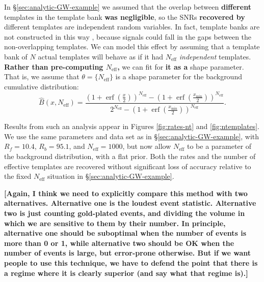 \documentclass[aps,prd]{revtex4-1}
\newcommand{\xmin}{x_\mathrm{min}}
\newcommand{\ilya}[1]{{\color{red} \bf #1}}
\DeclareMathOperator{\erf}{erf}
\begin{document}
In \S \ref{sec:analytic-GW-example} we assumed that the overlap
between \ilya{different} templates in the template bank \ilya{was
  negligible}, so the SNRs \ilya{recovered by} different templates are
independent random variables.  In fact, template banks are not
constructed in this way \citep[e.g.,][]{Owen:1998dk,Ajith:2008},
because signals could fall in the gaps between the non-overlapping
templates.  We can model this effect by assuming that a template bank
of $N$ actual templates will behave as if it had $N_\mathrm{eff}$
\emph{independent} templates.  \ilya{Rather than pre-computing
  $N_\mathrm{eff}$,} we can fit for \ilya{it as a} shape parameter.
That is, we assume that \ilya{$\theta = \{N_\mathrm{eff}\}$} is a
shape parameter for the background cumulative distribution:
\begin{equation}
  \hat{B}\left(x, N_\mathrm{eff}\right) = \frac{\left( 1 + \erf\left(
    \frac{x}{2} \right) \right)^{N_\mathrm{eff}} - \left( 1 +
    \erf\left( \frac{\xmin}{2} \right)
    \right)^{N_\mathrm{eff}}}{2^{N_\mathrm{eff}} - \left( 1 +
    \erf\left( \frac{\xmin}{2} \right) \right)^{N_\mathrm{eff}} }.
\end{equation}

Results from such an analysis appear in Figures \ref{fig:rates-nt} and
\ref{fig:ntemplates}.  We use the same parameters and data set as in
\S \ref{sec:analytic-GW-example}, with $R_f = 10.4$, $R_b = 95.1$, and
$N_\mathrm{eff} = 1000$, but now allow $N_\mathrm{eff}$ to be a
parameter of the background distribution, with a flat prior.  Both the
rates and the number of effective templates are recovered without
significant loss of accuracy relative to the fixed $N_\mathrm{eff}$
situation in \S \ref{sec:analytic-GW-example}.

\ilya{[Again, I think we need to explicitly compare this method with
    two alternatives.  Alternative one is the loudest event statistic.
    Alternative two is just counting gold-plated events, and dividing
    the volume in which we are sensitive to them by their number.  In
    principle, alternative one should be suboptimal when the number of
    events is more than 0 or 1, while alternative two should be OK
    when the number of events is large, but error-prone otherwise.
    But if we want people to use this technique, we have to defend the
    point that there is a regime where it is clearly superior (and say
    what that regime is).]}
\end{document}
